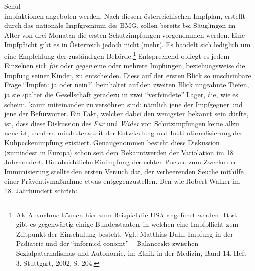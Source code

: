 \documentclass[
    a4paper,
    12pt,
    hyphens,
    chapterprefix=true,
    headheight=33pt,
    footheight=29pt,
    headings=optiontohead, %
]{scrartcl}
\begin{document}
Schul-\\impfaktionen angeboten werden. Nach diesem österreichischen Impfplan, erstellt durch das nationale Impfgremium des BMG, sollen bereits bei Säuglingen im Alter von drei Monaten die ersten Schutzimpfungen vorgenommen werden. Eine Impfpflicht gibt es in Österreich jedoch nicht (mehr). Es handelt sich lediglich um eine Empfehlung der zuständigen Behörde.\footnote{Als Ausnahme können hier zum Beispiel die USA angeführt werden. Dort gibt es gegenwärtig einige Bundesstaaten, in welchen eine Impfpflicht zum Zeitpunkt der Einschulung besteht. Vgl.: Matthias Dahl, Impfung in der Pädiatrie und der "`informed consent"' -- Balanceakt zwischen Sozialpaternalismus und Autonomie, in: Ethik in der Medizin, Band 14, Heft 3, Stuttgart, 2002, S. 204.} Entsprechend obliegt es jedem Einzelnen sich \textit{für} oder \textit{gegen} eine oder mehrere Impfungen, beziehungsweise die Impfung seiner Kinder, zu entscheiden. Diese auf den ersten Blick so unscheinbare Frage "`Impfen: ja oder nein?"' beinhaltet auf den zweiten Blick ungeahnte Tiefen, ja sie spaltet die Gesellschaft geradezu in zwei "`verfeindete"' Lager, die, wie es scheint, kaum miteinander zu versöhnen sind: nämlich jene der Impfgegner und jene der Befürworter. Ein Fakt, welcher dabei den wenigsten bekannt sein dürfte, ist, dass diese Diskussion des \textit{Für} und \textit{Wider} von Schutzimpfungen keine allzu neue ist, sondern mindestens seit der Entwicklung und Institutionalisierung der Kuhpockenimpfung existiert. Genaugenommen besteht diese Diskussion (zumindest in Europa) schon seit dem Bekanntwerden der Variolation im 18. Jahrhundert. Die absichtliche Einimpfung der echten Pocken zum Zwecke der Immunisierung stellte den ersten Versuch dar, der verheerenden Seuche mithilfe einer Präventivmaßnahme etwas entgegenzustellen. Den wie Robert Walker im 18. Jahrhundert schrieb: \\
\end{document}
